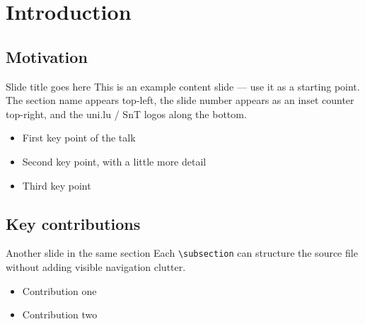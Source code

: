 \section{Introduction}

\subsection{Motivation}
\begin{frame}{Slide title goes here}
This is an example content slide --- use it as a starting point. The section
name appears top-left, the slide number appears as an inset counter top-right, and the
uni.lu / SnT logos along the bottom.
\vspace{1em}
\begin{itemize}[<+->]
  \item First key point of the talk
  \item Second key point, with a little more detail
  \item Third key point
\end{itemize}
\end{frame}

\subsection{Key contributions}
\begin{frame}{Another slide in the same section}
Each \texttt{\textbackslash subsection} can structure the source file without
adding visible navigation clutter.
\begin{itemize}[<+->]
  \item Contribution one
  \item Contribution two
\end{itemize}
\end{frame}
